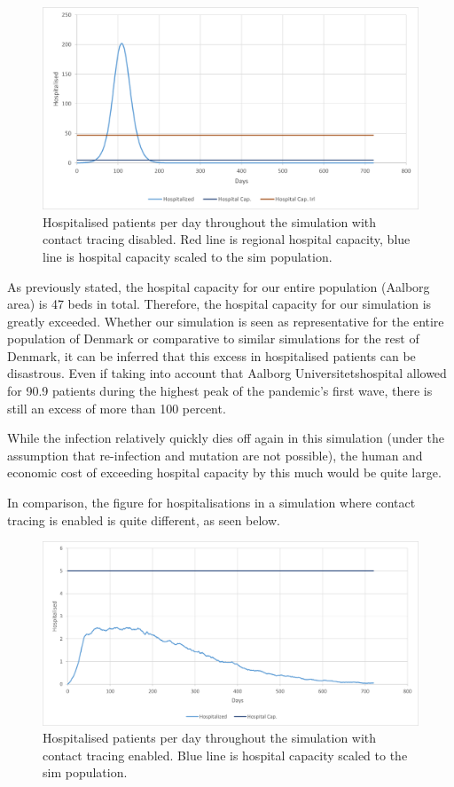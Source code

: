 \begin{figure}[H]
  \centering
  \includegraphics[width=140mm]{0_billeder/HOS_NO_CT.png}
  \caption{Hospitalised patients per day throughout the simulation with contact tracing disabled. Red line is regional hospital capacity, blue line is hospital capacity scaled to the sim population.}
  \label{fig:hospitalized NO CT}
\end{figure}
As previously stated, the hospital capacity for our entire population (Aalborg area) is 47 beds in total. Therefore, the hospital capacity for our simulation is greatly exceeded. Whether our simulation is seen as representative for the entire population of Denmark or comparative to similar simulations for the rest of Denmark, it can be inferred that this excess in hospitalised patients can be disastrous. Even if taking into account that Aalborg Universitetshospital allowed for 90.9 patients during the highest peak of the pandemic's first wave, there is still an excess of more than 100 percent.

While the infection relatively quickly dies off again in this simulation (under the assumption that re-infection and mutation are not possible), the human and economic cost of exceeding hospital capacity by this much would be quite large.

In comparison, the figure for hospitalisations in a simulation where contact tracing is enabled is quite different, as seen below.

\begin{figure}[H]
  \centering
  \includegraphics[width=140mm]{0_billeder/HOS_CT.png}
  \caption{Hospitalised patients per day throughout the simulation with contact tracing enabled. Blue line is hospital capacity scaled to the sim population.}
  \label{fig:hospitalized WITH CT}
\end{figure}

